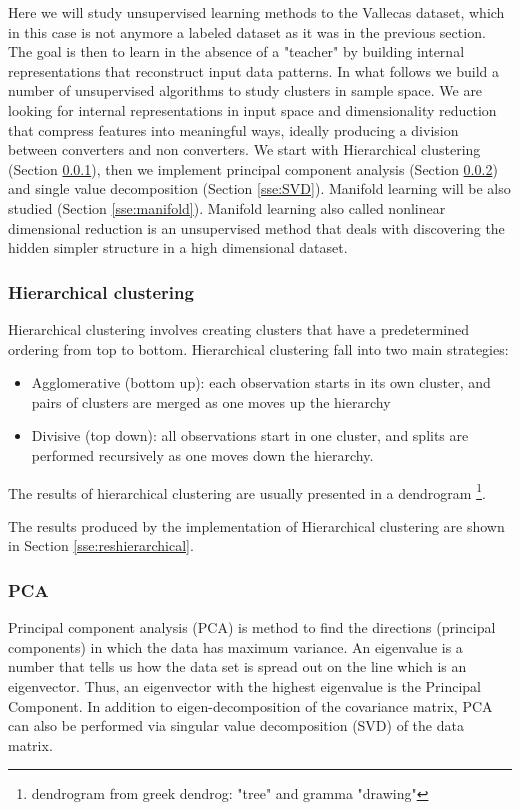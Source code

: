 \documentclass[11pt]{article}
\theoremstyle{definition}
\theoremstyle{remark}
\begin{document}
{Here we will study unsupervised learning methods to the Vallecas dataset, which in this case is not anymore a labeled dataset as it was in the previous section. The goal is then to learn in the absence of a "teacher" by building internal representations that reconstruct input data patterns.
In what follows we build a number of unsupervised algorithms to study clusters in sample space. We are looking for internal representations in input space and dimensionality reduction that compress features into meaningful ways, ideally producing a division between converters and non converters. We start with Hierarchical clustering (Section \ref{sse:hierarchical}), then we implement principal component analysis (Section \ref{sse:PCA}) and single value decomposition (Section \ref{sse:SVD}). Manifold learning will be also studied (Section \ref{sse:manifold}). Manifold learning also called nonlinear dimensional reduction is an unsupervised method that deals with discovering the hidden simpler structure in a high dimensional dataset.


\subsubsection{Hierarchical clustering}
\label{sse:hierarchical}

Hierarchical clustering involves creating clusters that have a predetermined ordering from top to bottom. Hierarchical clustering fall into two main strategies: 
\begin{itemize}
	\item Agglomerative (bottom up): each observation starts in its own cluster, and pairs of clusters are merged as one moves up the hierarchy
	\item Divisive (top down): all observations start in one cluster, and splits are performed recursively as one moves down the hierarchy.
\end{itemize}
The results of hierarchical clustering are usually presented in a dendrogram \footnote{dendrogram from greek dendrog: "tree" and gramma "drawing"}.

The results produced by the implementation of Hierarchical clustering are shown in Section \ref{sse:reshierarchical}.

\subsubsection{PCA}
\label{sse:PCA}
Principal component analysis (PCA) is  method to find the directions (principal components) in which the data has maximum variance. An eigenvalue is a number that tells us how the data set is spread out on the line which is an eigenvector. Thus, an eigenvector with the highest eigenvalue is the Principal Component. In addition to eigen-decomposition of the covariance matrix, PCA can also be performed via singular value decomposition (SVD) of the data matrix.

}
\end{document}
